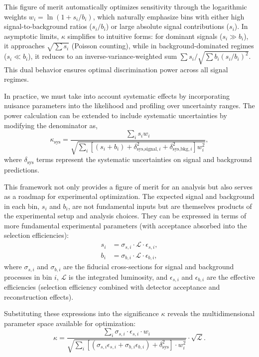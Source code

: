 This figure of merit automatically optimizes sensitivity through the logarithmic weights $w_i = \ln(1 + s_i/b_i)$, which naturally emphasize bins with either high signal-to-background ratios ($s_i/b_i$) or large absolute signal contributions ($s_i$). In asymptotic limits, $\kappa$ simplifies to intuitive forms: for dominant signals ($s_i \gg b_i$), it approaches $\sqrt{\sum s_i}$ (Poisson counting), while in background-dominated regimes ($s_i \ll b_i$), it reduces to an inverse-variance-weighted sum $\sum s_i / \sqrt{\sum b_i (s_i/b_i)^2}$. This dual behavior ensures optimal discrimination power across all signal regimes.

In practice, we must take into account systematic effects by incorporating nuisance parameters into the likelihood and profiling over uncertainty ranges. The power calculation can be extended to include systematic uncertainties by modifying the denominator as,
\begin{equation}
	\boxed{
	\kappa_{\text{sys}} = \frac{\sum_i s_i w_i}{\sqrt{\sum_i \left[(s_i + b_i) + \delta^2_{\text{sys,signal},i} + \delta^2_{\text{sys,bkg},i}\right] w_i^2}},
}
\label{eq:kappa_with_systematics}
\end{equation}
where $\delta_{\text{sys}}$ terms represent the systematic uncertainties on signal and background predictions.

This framework not only provides a figure of merit for an analysis but also serves as a roadmap for experimental optimization. The expected signal and background in each bin, $s_i$ and $b_i$, are not fundamental inputs but are themselves products of the experimental setup and analysis choices. They can be expressed in terms of more fundamental experimental parameters (with acceptance absorbed into the selection efficiencies):
\begin{align*}
    s_i &= \sigma_{s,i} \cdot \mathcal{L} \cdot \epsilon_{s,i}, \\
    b_i &= \sigma_{b,i} \cdot \mathcal{L} \cdot \epsilon_{b,i},
\end{align*}
where $\sigma_{s,i}$ and $\sigma_{b,i}$ are the fiducial cross-sections for signal and background processes in bin $i$, $\mathcal{L}$ is the integrated luminosity, and $\epsilon_{s,i}$ and $\epsilon_{b,i}$ are the effective efficiencies (selection efficiency combined with detector acceptance and reconstruction effects).

Substituting these expressions into the significance $\kappa$ reveals the multidimensional parameter space available for optimization:
\[
\kappa = \frac{\sum_i \sigma_{s,i} \cdot \epsilon_{s,i} \cdot w_i}
{\sqrt{\sum_i \left[ (\sigma_{s,i}\epsilon_{s,i} + \sigma_{b,i}\epsilon_{b,i}) + \delta^2_{\text{sys}} \right] \cdot w_i^2}} \cdot \sqrt{\mathcal{L}}.
\]


